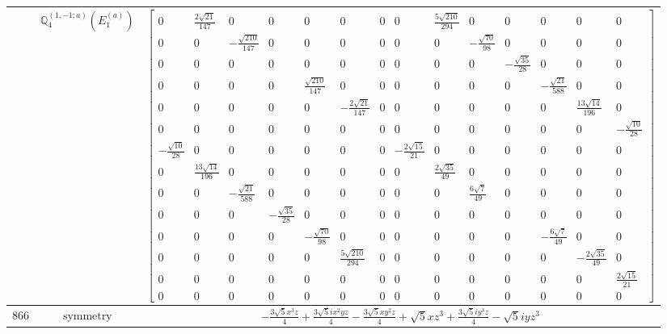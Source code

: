 \documentclass[fleqn,8pt,landscape]{jsarticle}
\begin{document}
\begin{longtable}{ccc}
$  $ & $ \mathbb{Q}_{4}^{(1,-1;a)}(E_{1}^{(a)}) $ & $ \begin{bmatrix} 0 & \frac{2 \sqrt{21}}{147} & 0 & 0 & 0 & 0 & 0 & 0 & \frac{5 \sqrt{210}}{294} & 0 & 0 & 0 & 0 & 0 \\ 0 & 0 & - \frac{\sqrt{210}}{147} & 0 & 0 & 0 & 0 & 0 & 0 & - \frac{\sqrt{70}}{98} & 0 & 0 & 0 & 0 \\ 0 & 0 & 0 & 0 & 0 & 0 & 0 & 0 & 0 & 0 & - \frac{\sqrt{35}}{28} & 0 & 0 & 0 \\ 0 & 0 & 0 & 0 & \frac{\sqrt{210}}{147} & 0 & 0 & 0 & 0 & 0 & 0 & - \frac{\sqrt{21}}{588} & 0 & 0 \\ 0 & 0 & 0 & 0 & 0 & - \frac{2 \sqrt{21}}{147} & 0 & 0 & 0 & 0 & 0 & 0 & \frac{13 \sqrt{14}}{196} & 0 \\ 0 & 0 & 0 & 0 & 0 & 0 & 0 & 0 & 0 & 0 & 0 & 0 & 0 & - \frac{\sqrt{10}}{28} \\ - \frac{\sqrt{10}}{28} & 0 & 0 & 0 & 0 & 0 & 0 & - \frac{2 \sqrt{15}}{21} & 0 & 0 & 0 & 0 & 0 & 0 \\ 0 & \frac{13 \sqrt{14}}{196} & 0 & 0 & 0 & 0 & 0 & 0 & \frac{2 \sqrt{35}}{49} & 0 & 0 & 0 & 0 & 0 \\ 0 & 0 & - \frac{\sqrt{21}}{588} & 0 & 0 & 0 & 0 & 0 & 0 & \frac{6 \sqrt{7}}{49} & 0 & 0 & 0 & 0 \\ 0 & 0 & 0 & - \frac{\sqrt{35}}{28} & 0 & 0 & 0 & 0 & 0 & 0 & 0 & 0 & 0 & 0 \\ 0 & 0 & 0 & 0 & - \frac{\sqrt{70}}{98} & 0 & 0 & 0 & 0 & 0 & 0 & - \frac{6 \sqrt{7}}{49} & 0 & 0 \\ 0 & 0 & 0 & 0 & 0 & \frac{5 \sqrt{210}}{294} & 0 & 0 & 0 & 0 & 0 & 0 & - \frac{2 \sqrt{35}}{49} & 0 \\ 0 & 0 & 0 & 0 & 0 & 0 & 0 & 0 & 0 & 0 & 0 & 0 & 0 & \frac{2 \sqrt{15}}{21} \\ 0 & 0 & 0 & 0 & 0 & 0 & 0 & 0 & 0 & 0 & 0 & 0 & 0 & 0 \end{bmatrix} $ \\ \hline
$ 866 $ & $ \text{symmetry} $ & $ - \frac{3 \sqrt{5} x^{3} z}{4} + \frac{3 \sqrt{5} i x^{2} y z}{4} - \frac{3 \sqrt{5} x y^{2} z}{4} + \sqrt{5} x z^{3} + \frac{3 \sqrt{5} i y^{3} z}{4} - \sqrt{5} i y z^{3} $ \\

\end{longtable}
\end{document}
